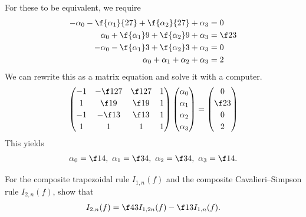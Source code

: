 \documentclass[a4paper]{article}
\begin{document}
For these to be equivalent, we require
\begin{align*}
-\alpha_0 - \f{\alpha_1}{27} + \f{\alpha_2}{27} + \alpha_3 &= 0 \\
\alpha_0 + \f{\alpha_1}9 + \f{\alpha_2}9 + \alpha_3 &= \f23 \\
-\alpha_0 - \f{\alpha_1}3 + \f{\alpha_2}3 + \alpha_3 &= 0 \\
\alpha_0 + \alpha_1 + \alpha_2 + \alpha_3 &= 2
\end{align*}
We can rewrite this as a matrix equation and solve it with a computer. \[
\begin{pmatrix}
-1 & -\f1{27} & \f1{27} & 1 \\[0.5ex]
1 & \f19 & \f19 & 1 \\[0.5ex]
-1 & -\f13 & \f13 & 1 \\[0.5ex]
1 & 1 & 1 & 1
\end{pmatrix}
\begin{pmatrix}
\alpha_0 \\[0.5ex]
\alpha_1 \\[0.5ex]
\alpha_2 \\[0.5ex]
\alpha_3
\end{pmatrix}
= \begin{pmatrix}
0 \\[0.5ex]
\f23 \\[0.5ex]
0 \\[0.5ex]
2
\end{pmatrix}
\] This yields \[
\alpha_0 = \f14,\ \alpha_1 = \f34,\ \alpha_2 = \f34,\ \alpha_3 = \f14.
\]



\begin{questionbody}
For the composite trapezoidal rule $I_{1, n}(f)$ and the composite Cavalieri--Simpson rule $I_{2, n}(f)$, show that \[ %
I_{2, n}(f) = \f43 I_{1, 2n}(f) - \f13 I_{1, n}(f).
\]
\end{questionbody}
\end{document}
